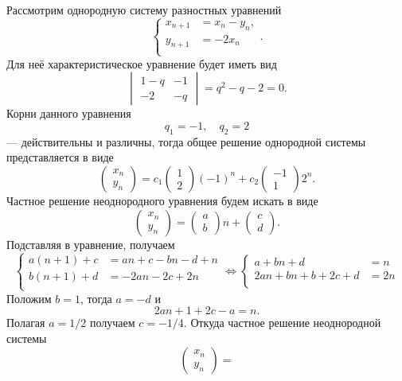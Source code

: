 \documentclass[a4paper]{article}
\begin{document}
\begin{sol}
Рассмотрим однородную систему разностных уравнений
\[
\left\{
\begin{aligned}
x_{n+1}&= x_n -y_{n}, \\
y_{n+1}&=-2x_n  \\
\end{aligned}
\right.
.\] 
Для неё характеристическое уравнение будет иметь вид
\[
	\begin{vmatrix} 1-q & -1 \\ -2 & -q \end{vmatrix} =
q^2-q-2=0
.\] 
Корни данного уравнения
\[
q_1=-1,\quad q_2=2
\]
--- действительны и различны, тогда общее решение однородной
системы представляется в виде
\[
	\begin{pmatrix} x_{n} \\ y_{n} \end{pmatrix} =
	c_1 \begin{pmatrix} 1\\2 \end{pmatrix} (-1)^n+
	c_2 \begin{pmatrix} -1\\1 \end{pmatrix} 2^n
.\] 
Частное решение неоднородного уравнения будем искать в
виде
\[
\begin{pmatrix} x_n \\y_{n} \end{pmatrix} =\begin{pmatrix}a\\b  \end{pmatrix} n+ \begin{pmatrix} c\\d \end{pmatrix} 
.\] 
Подставляя в уравнение, получаем
\[
\left\{
\begin{aligned}
	a(n+1)+c&= an+c-bn-d+n \\
	b(n+1)+d&= -2an-2c+2n \\
\end{aligned}
\right.
\Leftrightarrow
\left\{
\begin{aligned}
a+bn+d&= n \\
2an+bn+b+2c+d&= 2n \\
\end{aligned}
\right.
\] 
Положим $b=1$, тогда $a=-d$ и
 \[
2an+1+2c-a=n
.\] 
Полагая $a=1 /2$ получаем $c=- 1 /4$. Откуда частное решение
неоднородной системы
 \[
\begin{pmatrix} x_{n} \\ y_{n} \end{pmatrix} =
\]
\end{sol}
\end{document}
